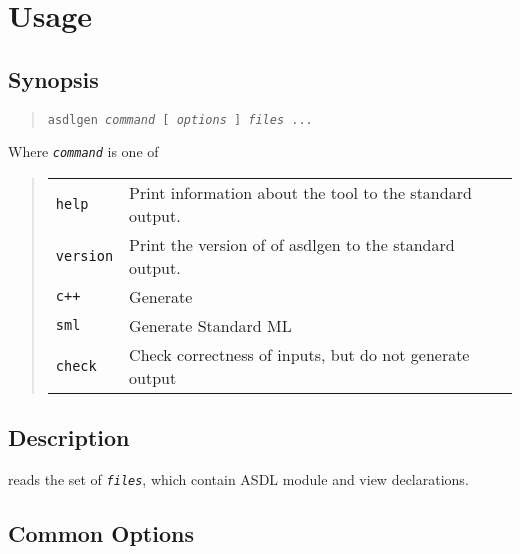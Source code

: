 %
\chapter{Usage}
\label{chap:usage}

\section*{Synopsis}
\begin{quote}
  \texttt{asdlgen \textit{command} [ \textit{options} ] \textit{files} ...}
\end{quote}%
%
Where \texttt{\textit{command}} is one of
\begin{quote}
  \begin{tabular}{ll}
    \texttt{help}
      & Print information about the \asdlgen{} tool to the standard output. \\
    \texttt{version}
      & Print the version of of asdlgen to the standard output. \\
    \texttt{c++}
      & Generate \Cplusplus{} \\
    \texttt{sml}
      & Generate Standard ML \\
    \texttt{check}
      & Check correctness of inputs, but do not generate output \\
  \end{tabular}%
\end{quote}%

\section*{Description}
\asdlgen{} reads the set of \texttt{\textit{files}}, which contain ASDL module
and view declarations.

\section*{Common Options}

